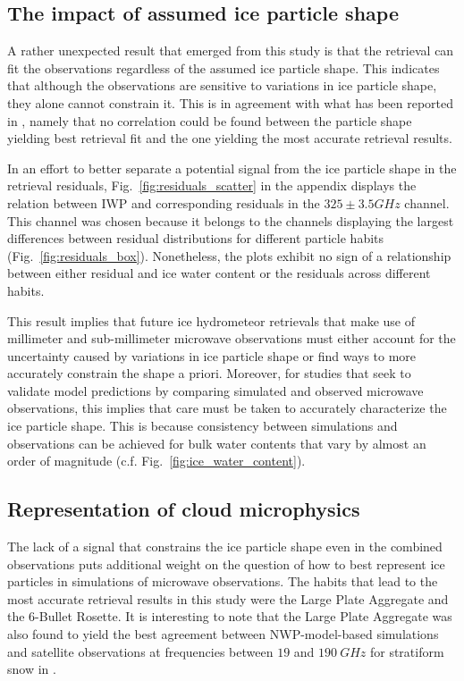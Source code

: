 \documentclass[journal abbreviation, manuscript]{copernicus}
\begin{document}
\subsection{The impact of assumed ice particle shape}

A rather unexpected result that emerged from this study is that the retrieval
can fit the observations regardless of the assumed ice particle shape. This
indicates that although the observations are sensitive to variations in ice
particle shape, they alone cannot constrain it. This is in agreement with what
has been reported in \citet{pfreundschuh20}, namely that no correlation could be
found between the particle shape yielding best retrieval fit and the one
yielding the most accurate retrieval results.

In an effort to better separate a potential signal from the ice particle shape
in the retrieval residuals, Fig.~\ref{fig:residuals_scatter} in the appendix
displays the relation between IWP and corresponding residuals in the $325 \pm
3.5 \unit{GHz}$ channel. This channel was chosen because it belongs to the
channels displaying the largest differences between residual distributions for
different particle habits (Fig.~\ref{fig:residuals_box}). Nonetheless, the
plots exhibit no sign of a relationship between either residual and ice
water content or the residuals across different habits.

This result implies that future ice hydrometeor retrievals that make use of
millimeter and sub-millimeter microwave observations must either account for the
uncertainty caused by variations in ice particle shape or find ways to more
accurately constrain the shape a priori. Moreover, for studies that seek to
validate model predictions by comparing simulated and observed microwave
observations, this implies that care must be taken to accurately characterize
the ice particle shape. This is because consistency between simulations and
observations can be achieved for bulk water contents that vary by almost an order of
magnitude (c.f. Fig.~\ref{fig:ice_water_content}).

\subsection{Representation of cloud microphysics}

The lack of a signal that constrains the ice particle shape even in the combined
observations puts additional weight on the question of how to best represent ice
particles in simulations of microwave observations. The habits that lead to the
most accurate retrieval results in this study were the Large Plate Aggregate and
the 6-Bullet Rosette. It is interesting to note that the Large Plate Aggregate
was also found to yield the best agreement between NWP-model-based simulations
and satellite observations at frequencies between $19$ and $190\ \unit{GHz}$ for
stratiform snow in \citet{geer21}.
\end{document}
